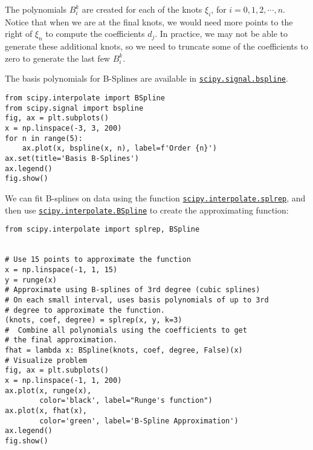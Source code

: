 \documentclass[12pt, a4paper]{article}
\begin{document}
The polynomials \(B_i^k\) are created for each of the knots \(\xi_i\), for \(i=0,1,2,\cdots,n\).
Notice that when we are at the final knots, we would need more points to the right of \(\xi_n\) to compute the coefficients \(d_j\).
In practice, we may not be able to generate these additional knots, so we need to truncate some of the coefficients to zero to generate the last few \(B_i^k\).

The basis polynomials for B-Splines are available in \href{https://docs.scipy.org/doc/scipy/reference/generated/scipy.signal.bspline.html?highlight=signal.bspline\#scipy.signal.bspline}{\texttt{scipy.signal.bspline}}.
\lstset{language=jupyter-python,label= ,caption= ,captionpos=b,numbers=none}
\begin{lstlisting}
from scipy.interpolate import BSpline
from scipy.signal import bspline
fig, ax = plt.subplots()
x = np.linspace(-3, 3, 200)
for n in range(5):
    ax.plot(x, bspline(x, n), label=f'Order {n}')
ax.set(title='Basis B-Splines')
ax.legend()
fig.show()
\end{lstlisting}

We can fit B-splines on data using the function \href{https://docs.scipy.org/doc/scipy/reference/generated/scipy.interpolate.splrep.html\#scipy.interpolate.splrep}{\texttt{scipy.interpolate.splrep}}, and then use \href{https://docs.scipy.org/doc/scipy/reference/generated/scipy.interpolate.BSpline.html\#scipy-interpolate-bspline}{\texttt{scipy.interpolate.BSpline}} to create the approximating function:
\lstset{language=jupyter-python,label= ,caption= ,captionpos=b,numbers=none}
\begin{lstlisting}
from scipy.interpolate import splrep, BSpline


# Use 15 points to approximate the function
x = np.linspace(-1, 1, 15)
y = runge(x)
# Approximate using B-splines of 3rd degree (cubic splines)
# On each small interval, uses basis polynomials of up to 3rd
# degree to approximate the function.
(knots, coef, degree) = splrep(x, y, k=3)
#  Combine all polynomials using the coefficients to get
# the final approximation.
fhat = lambda x: BSpline(knots, coef, degree, False)(x)
# Visualize problem
fig, ax = plt.subplots()
x = np.linspace(-1, 1, 200)
ax.plot(x, runge(x),
        color='black', label="Runge's function")
ax.plot(x, fhat(x),
        color='green', label='B-Spline Approximation')
ax.legend()
fig.show()
\end{lstlisting}
\end{document}
